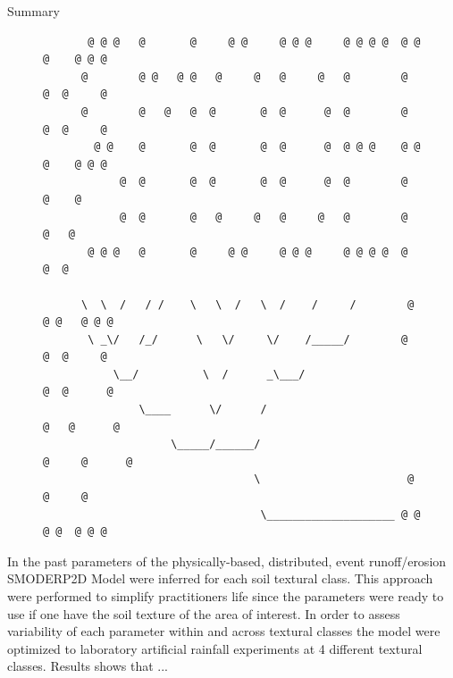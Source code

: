




\begin{alertblock}{Summary}
  \begin{figure}
    \begin{minipage}{\dimexpr\linewidth-2\fboxrule-2\fboxsep}
    {\tiny
    \begin{lstlisting}
       @ @ @   @       @     @ @     @ @ @     @ @ @ @  @ @ @    @ @ @
      @        @ @   @ @   @     @   @     @   @        @     @  @     @
      @        @   @   @  @       @  @      @  @        @     @  @     @
        @ @    @       @  @       @  @      @  @ @ @    @ @ @    @ @ @
            @  @       @  @       @  @      @  @        @   @    @
            @  @       @   @     @   @     @   @        @    @   @
       @ @ @   @       @     @ @     @ @ @     @ @ @ @  @     @  @

      \  \  /   / /    \   \  /   \  /    /     /        @ @ @   @ @ @
       \ _\/   /_/      \   \/     \/    /_____/        @     @  @     @
           \__/          \  /      _\___/                     @  @      @
               \____      \/      /                          @   @      @
                    \_____/______/                         @     @      @
                                 \                       @       @     @
                                  \____________________ @ @ @ @  @ @ @
    \end{lstlisting}
    }
    \end{minipage}
  \end{figure}
  In the past parameters of the phy\-sically-based, distributed, event runoff/erosion SMODERP2D Model were inferred for each soil textural class. This approach were performed to simplify practitioners life since the parameters were ready to use if one have the soil texture of the area of interest. In order to assess variability of each parameter within and across textural classes the model were optimized to laboratory artificial rainfall experiments at 4 different textural classes. 
  Results shows that ...
\end{alertblock}\vspace{0.9cm}





